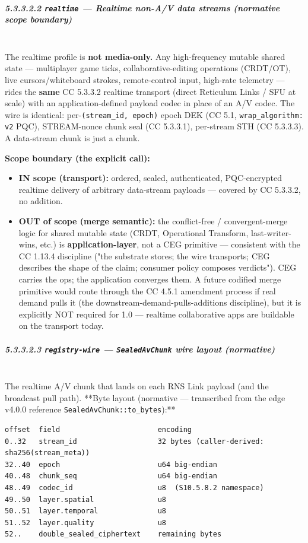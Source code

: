 \documentclass[11pt]{article}
\begin{document}
\subparagraph{5.3.3.2.2 \texttt{realtime} — Realtime non-A/V data streams (normative scope boundary)}\mbox{}\\


The realtime profile is \textbf{not media-only.} Any high-frequency mutable shared state — multiplayer game ticks, collaborative-editing operations (CRDT/OT), live cursors/whiteboard strokes, remote-control input, high-rate telemetry — rides the \textbf{same} CC 5.3.3.2 realtime transport (direct Reticulum Links / SFU at scale) with an application-defined payload codec in place of an A/V codec. The wire is identical: per-\texttt{(stream\_id, epoch)} epoch DEK (CC 5.1, \texttt{wrap\_algorithm: v2} PQC), STREAM-nonce chunk seal (CC 5.3.3.1), per-stream STH (CC 5.3.3.3). A data-stream chunk is just a chunk.


\textbf{Scope boundary (the explicit call):}

\begin{itemize}\setlength\itemsep{0pt}
\item \textbf{IN scope (transport):} ordered, sealed, authenticated, PQC-encrypted realtime delivery of arbitrary data-stream payloads — covered by CC 5.3.3.2, no addition.
\item \textbf{OUT of scope (merge semantic):} the conflict-free / convergent-merge logic for shared mutable state (CRDT, Operational Transform, last-writer-wins, etc.) is \textbf{application-layer}, not a CEG primitive — consistent with the CC 1.13.4 discipline ("the substrate stores; the wire transports; CEG describes the shape of the claim; consumer policy composes verdicts"). CEG carries the ops; the application converges them. A future codified merge primitive would route through the CC 4.5.1 amendment process if real demand pulls it (the downstream-demand-pulls-additions discipline), but it is explicitly NOT required for 1.0 — realtime collaborative apps are buildable on the transport today.
\end{itemize}


\subparagraph{5.3.3.2.3 \texttt{registry-wire} — \texttt{SealedAvChunk} wire layout (normative)}\mbox{}\\


The realtime A/V chunk that lands on each RNS Link payload (and the broadcast pull path). **Byte layout (normative — transcribed from the edge v4.0.0 reference \texttt{SealedAvChunk::to\_bytes}):**


\begin{lstlisting}
offset  field                       encoding
0..32   stream_id                   32 bytes (caller-derived: sha256(stream_meta))
32..40  epoch                       u64 big-endian
40..48  chunk_seq                   u64 big-endian
48..49  codec_id                    u8  (S10.5.8.2 namespace)
49..50  layer.spatial               u8
50..51  layer.temporal              u8
51..52  layer.quality               u8
52..    double_sealed_ciphertext    remaining bytes
\end{lstlisting}
\end{document}
